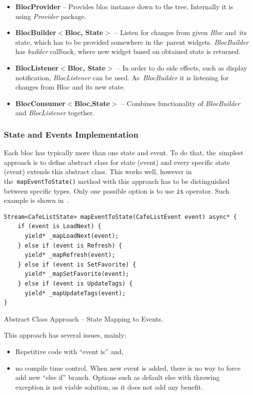 \begin{itemize}
    \item \textbf{BlocProvider} -- Provides \gls{bloc} instance down to the tree. Internally it is using \textit{Provider} package.
    \item \textbf{BlocBuilder$<$Bloc, State$>$} -- Listen for changes from given \textit{Bloc} and~its state, which has to be provided somewhere in the~parent widgets. \textit{BlocBuilder} has \textit{builder} callback, where new widget based on obtained state is returned. 
    \item \textbf{BlocListener$<$Bloc, State$>$} -- In order to do side effects, such as display notification, \textit{BlocListener} can be used. As~\textit{BlocBuilder} it is listening for changes from Bloc and its new state. 
    \item \textbf{BlocConsumer$<$Bloc,State$>$} -- Combines functionality of \textit{BlocBuilder} and \textit{BlocListener} together.
\end{itemize}

\subsubsection{State and Events Implementation}
Each \gls{bloc} has typically more than one state and event. To do that, the~simplest approach is to define abstract class for state (event) and every specific state (event) extends this abstract class. This works well, however in the~\verb|mapEventToState()| method with this approach has to be distinguished between specific types. Only one possible option is to use \verb|is| operator. Such example is shown in~. 

\begin{listing}[ht]
\begin{verbatim}
Stream<CafeListState> mapEventToState(CafeListEvent event) async* {
    if (event is LoadNext) {
      yield* _mapLoadNext(event);
    } else if (event is Refresh) {
      yield* _mapRefresh(event);
    } else if (event is SetFavorite) {
      yield* _mapSetFavorite(event);
    } else if (event is UpdateTags) {
      yield* _mapUpdateTags(event);
}
\end{verbatim}
\caption{Abstract Class Approach -- State Mapping to Events.}
\label{listing:ct-state-map-abstract}
\end{listing}

This approach has several issues, mainly: 

\begin{itemize}
    \item Repetitive code with ``event is'' and,
    \item no compile time control. When new event is added, there is no way to force add new ``else if'' branch. Options such as default else with throwing exception is not viable solution, as it does not add any benefit.
\end{itemize}


